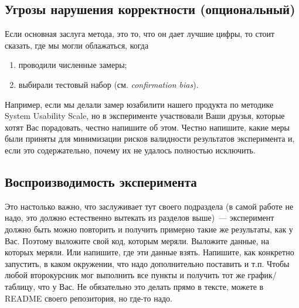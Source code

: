 \subsection{Угрозы нарушения корректности (опциональный)}

Если основная заслуга метода, это то, что он дает лучшие цифры, то стоит сказать, где мы могли облажаться, когда
\begin{enumerate}
    \item проводили численные замеры;
    \item выбирали тестовый набор (см. \emph{confirmation bias}).
\end{enumerate}

Например, если мы делали замер юзабилити нашего продукта по методике System Usability Scale, но в эксперименте участвовали Ваши друзья, которые хотят Вас порадовать, честно напишите об этом.
Честно напишите, какие меры были приняты для минимизации рисков валидности результатов эксперимента и, если это содержательно, почему их не удалось полностью исключить.

\subsection{Воспроизводимость эксперимента}

Это настолько важно, что заслуживает тут своего подраздела (в самой работе не надо, это должно естественно вытекать из разделов выше)~--- эксперимент должно быть можно повторить и получить примерно такие же результаты, как у Вас.
Поэтому выложите свой код, которым меряли.
Выложите данные, на которых меряли.
Или напишите, где эти данные взять.
Напишите, как конкретно запустить, в каком окружении, что надо дополнительно поставить и т.п.
Чтобы любой второкурсник мог выполнить все пункты и получить тот же график/таблицу, что у Вас.
Не обязательно это делать прямо в тексте, можете в README своего репозитория, но где-то надо.
